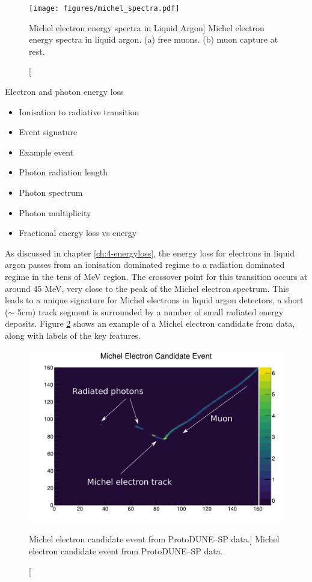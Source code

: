 \begin{figure}
	\centering
	\texttt{[image: figures/michel\_spectra.pdf]}
	\caption
	[Michel electron energy spectra in Liquid Argon]
	{Michel electron energy spectra in liquid argon. (a) free muons. (b) muon 
	capture at rest.}
	\label{fig:michel_spec}
\end{figure}

\begin{mccorrection}
	Electron and photon energy loss 
	\begin{itemize}
	\item Ionisation to radiative transition
	\item Event signature
	\item Example event
	\item Photon radiation length
	\item Photon spectrum
	\item Photon multiplicity
	\item Fractional energy loss vs energy
	\end{itemize}
\end{mccorrection}

As discussed in chapter \ref{ch:4-energyloss}, the energy loss for electrons in
liquid argon passes from an ionisation dominated regime to a radiation dominated
regime in the tens of MeV region. The crossover point for this transition occurs
at around 45 MeV, very close to the peak of the Michel electron spectrum. This
leads to a unique signature for Michel electrons in liquid argon detectors, a
short ($\sim$ 5cm) track segment is surrounded by a number of small radiated 
energy deposits. Figure \ref{fig:michel_event} shows an example of a Michel 
electron candidate from \protodune{} data, along with labels of the key 
features.

\begin{figure}
	\centering
	\includegraphics[width=\textwidth]{figures/michel_candidate.pdf}
	\caption
	[Michel electron candidate event from ProtoDUNE--SP data.]
	{Michel electron candidate event from ProtoDUNE--SP data.}
	\label{fig:michel_event}
\end{figure}

